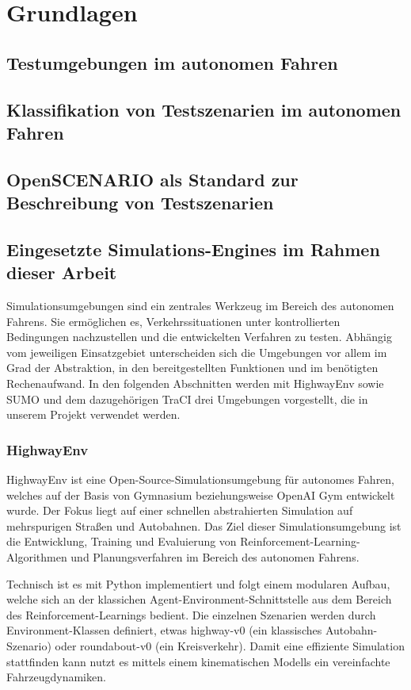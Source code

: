 \chapter{Grundlagen}

\section{Testumgebungen im autonomen Fahren}
\section{Klassifikation von Testszenarien im autonomen Fahren}
\section{OpenSCENARIO als Standard zur Beschreibung von Testszenarien}
\section{Eingesetzte Simulations-Engines im Rahmen dieser Arbeit}
Simulationsumgebungen sind ein zentrales Werkzeug im Bereich des autonomen Fahrens. Sie ermöglichen es, Verkehrssituationen unter kontrollierten Bedingungen nachzustellen und die entwickelten Verfahren zu testen. Abhängig vom jeweiligen Einsatzgebiet unterscheiden sich die Umgebungen vor allem im Grad der Abstraktion, in den bereitgestellten Funktionen und im benötigten Rechenaufwand. In den folgenden Abschnitten werden mit HighwayEnv sowie SUMO und dem dazugehörigen TraCI drei Umgebungen vorgestellt, die in unserem Projekt verwendet werden.
\subsection{HighwayEnv}
HighwayEnv ist eine Open-Source-Simulationsumgebung für autonomes Fahren, welches auf der Basis von Gymnasium beziehungsweise OpenAI Gym entwickelt wurde. Der Fokus liegt auf einer schnellen abstrahierten Simulation auf mehrspurigen Straßen und Autobahnen. Das Ziel dieser Simulationsumgebung ist die Entwicklung, Training und Evaluierung von Reinforcement-Learning-Algorithmen und Planungsverfahren im Bereich des autonomen Fahrens.

Technisch ist es mit Python implementiert und folgt einem modularen Aufbau, welche sich an der klassichen Agent-Environment-Schnittstelle aus dem Bereich des Reinforcement-Learnings bedient. Die einzelnen Szenarien werden durch Environment-Klassen definiert, etwas highway-v0 (ein klassisches Autobahn-Szenario) oder roundabout-v0 (ein Kreisverkehr). Damit eine effiziente Simulation stattfinden kann nutzt es mittels einem kinematischen Modells ein vereinfachte Fahrzeugdynamiken.

